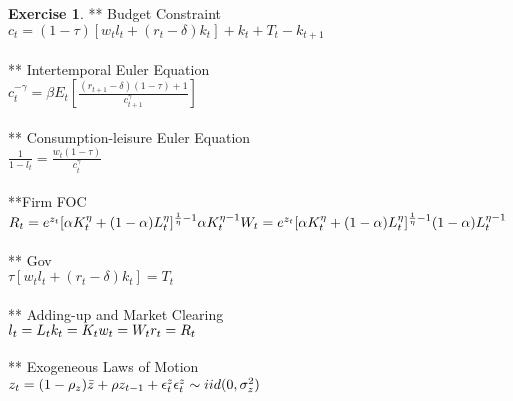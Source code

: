 \documentclass[letterpaper,12pt]{article}
\theoremstyle{definition}
\newtheorem{exercise}[theorem]{Exercise}
\begin{document}
\begin{spacing}{1.5}
	\begin{exercise} \label{DSGE_HW_CharEq_CES}
** Budget Constraint \\
$c_t = (1-\tau)[w_tl_t + (r_t-\delta)k_t] + k_t + T_t - k_{t+1}$\\
\\** Intertemporal Euler Equation\\
$c_t^{-\gamma} = \beta E_t[\frac{(r_{t+1}-\delta)(1-\tau) +1}{c_{t+1}^{\gamma}}]$
\\
\\** Consumption-leisure Euler Equation\\
$\frac{1}{1-l_t} = \frac{w_t(1-\tau)}{c_t^{\gamma}}$\\
\\**Firm FOC\\
$R_t =e^{z_t}[\alpha K_t^{\eta} + (1-\alpha)L_t^{\eta}]^{\frac{1}{\eta} - 1} \alpha K_t^{\eta -1}\\
W_t = e^{z_t}[\alpha K_t^{\eta} + (1-\alpha)L_t^{\eta}]^{\frac{1}{\eta} - 1}(1- \alpha) L_t^{\eta -1}$
\\
\\** Gov\\
$\tau[w_tl_t + (r_t-\delta)k_t] = T_t$
\\
\\** Adding-up and Market Clearing\\
$l_t = L_t\\
k_t = K_t\\
w_t = W_t\\
r_t = R_t$
\\
\\** Exogeneous Laws of Motion\\
$z_t = (1-\rho_z)\bar{z} + \rho z_{t-1} +\epsilon_t^z\\
\epsilon_t^z \sim iid(0, \sigma_z^2) $
	\end{exercise}


\end{spacing}
\end{document}

